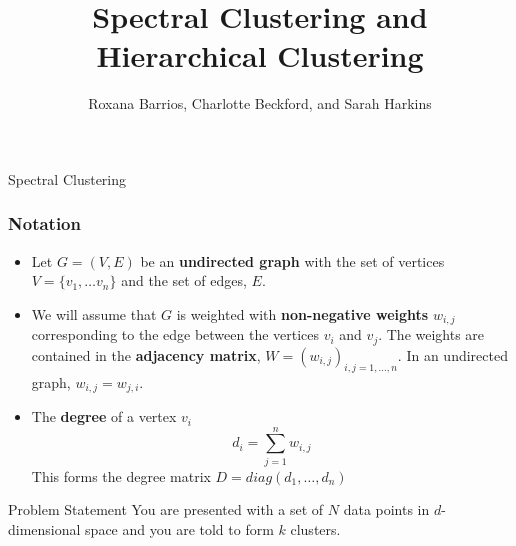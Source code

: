 \documentclass{beamer}
\title[Spectral and Hierarchical Clustering]{Spectral Clustering and Hierarchical Clustering}
\author{Roxana Barrios, Charlotte Beckford, and Sarah Harkins}
\institute{Math 526}
\begin{document}
\begin{frame}
\titlepage
\end{frame}

\begin{frame}
\begin{center}
  \textcolor{TennesseeOrange}{\huge Spectral Clustering}  
\end{center}

\end{frame}

\begin{frame}
\frametitle{Notation}

\begin{itemize}
    \item Let $G = (V,E)$ be an \textbf{undirected graph} with the set of vertices $V = \{ v_1, \dots v_n\}$ and the set of edges, $E$.  
    \item We will assume that $G$ is weighted with \textbf{non-negative weights} $w_{i,j}$ corresponding to the edge between the vertices $v_i$ and $v_j$. The weights are contained in the \textbf{adjacency matrix}, $W = (w_{i,j})_{i,j = 1, \dots , n}$. In an undirected graph, $w_{i,j} = w_{j,i}$. 
    \item The \textbf{degree} of a vertex $v_i$  $$d_i = \sum_{j=1}^{n} w_{i,j}$$ This forms the degree matrix $D= diag(d_1, \dots , d_n)$
\end{itemize}

\end{frame}

\begin{frame}{Problem Statement}
     You are presented with a set of $N$ data points in $d$-dimensional space and you are told to form $k$ clusters. 
\end{frame}
\end{document}
